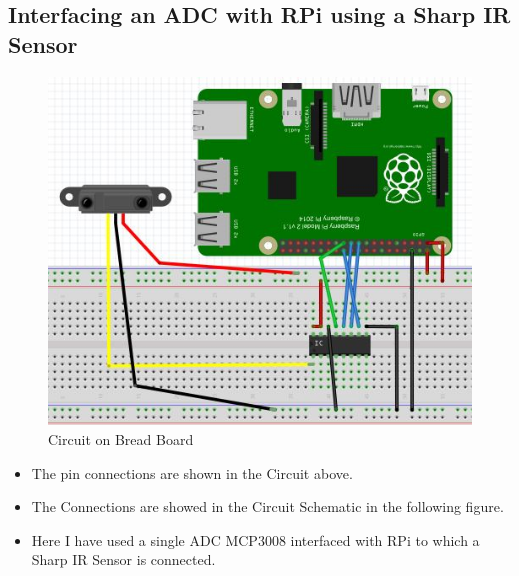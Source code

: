 \documentclass[11pt,a4paper]{article}
\begin{document}
\subsection{Interfacing an ADC with RPi using a Sharp IR Sensor}
        \begin{figure}[h!]
		\includegraphics[scale=0.7]{ckt.jpg}
		\centering
        \caption{Circuit on Bread Board}
        \end{figure}
  \begin{itemize}
  \item The pin connections are shown in the Circuit above.
  \item The Connections are showed in the Circuit Schematic in the following figure.
  \item Here I have used a single ADC MCP3008 interfaced with RPi to which a Sharp IR Sensor is connected.
  \end{itemize}

\newpage
\end{document}
